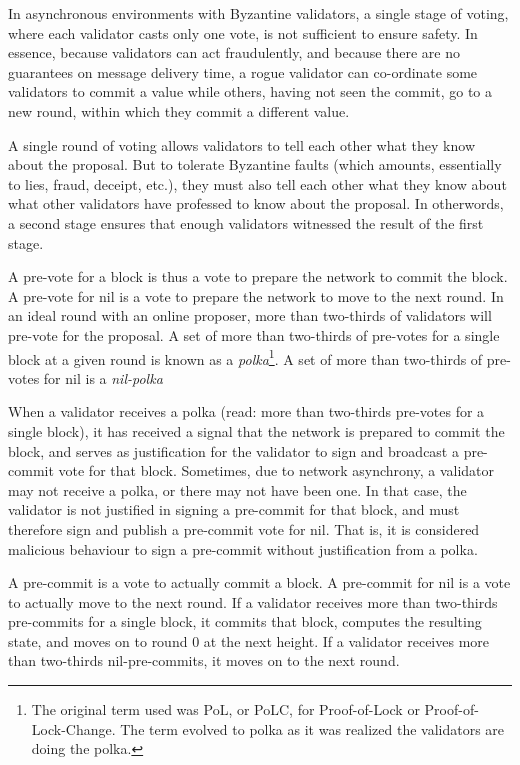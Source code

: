 In asynchronous environments with Byzantine validators, 
a single stage of voting, where each validator casts only one vote,
is not sufficient to ensure safety.
In essence, because validators can act fraudulently, 
and because there are no guarantees on message delivery time,
a rogue validator can co-ordinate some validators to commit a value
while others, having not seen the commit, 
go to a new round, within which they commit a different value.

A single round of voting allows validators to tell each other what they know about the proposal.	
But to tolerate Byzantine faults (which amounts, essentially to lies, fraud, deceipt, etc.), 
they must also tell each other what they know about what other validators have professed to know about the proposal.
In otherwords, a second stage ensures that enough validators witnessed the result of the first stage.

A pre-vote for a block is thus a vote to prepare the network to commit the block.
A pre-vote for nil is a vote to prepare the network to move to the next round.
In an ideal round with an online proposer, more than two-thirds of validators will pre-vote for the proposal.
A set of more than two-thirds of pre-votes for a single block at a given round is known as a \emph{polka}\footnote{The original term used was PoL, or PoLC, for Proof-of-Lock or Proof-of-Lock-Change. The term evolved to polka as it was realized the validators are doing the polka.}.
A set of more than two-thirds of pre-votes for nil is a \emph{nil-polka}

When a validator receives a polka (read: more than two-thirds pre-votes for a single block), 
it has received a signal that the network is prepared to commit the block,
and serves as justification for the validator to sign and broadcast a pre-commit vote for that block.
Sometimes, due to network asynchrony, a validator may not receive a polka, or there may not have been one. 
In that case, the validator is not justified in signing a pre-commit for that block, 
and must therefore sign and publish a pre-commit vote for nil.
That is, it is considered malicious behaviour to sign a pre-commit without justification from a polka.

A pre-commit is a vote to actually commit a block.
A pre-commit for nil is a vote to actually move to the next round.
If a validator receives more than two-thirds pre-commits for a single block, 
it commits that block, computes the resulting state,
and moves on to round 0 at the next height.
If a validator receives more than two-thirds nil-pre-commits,
it moves on to the next round.

